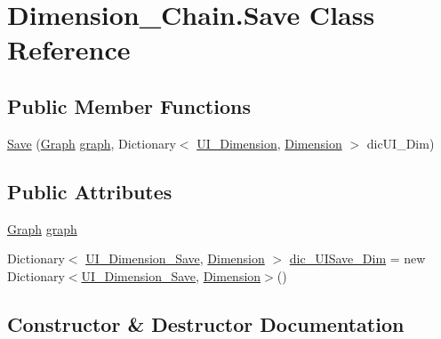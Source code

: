 \hypertarget{class_dimension___chain_1_1_save}{}\section{Dimension\+\_\+\+Chain.\+Save Class Reference}
\label{class_dimension___chain_1_1_save}
\subsection*{Public Member Functions}
\begin{DoxyCompactItemize}
\item 
\mbox{\hyperlink{class_dimension___chain_1_1_save_a609755b7e3eb7769c2679869f93cf8eb}{Save}} (\mbox{\hyperlink{class_dimension___chain_1_1_graph}{Graph}} \mbox{\hyperlink{class_dimension___chain_1_1_save_ae83ba48253eae3156de679a361ac853a}{graph}}, Dictionary$<$ \mbox{\hyperlink{class_dimension___chain_1_1_u_i___dimension}{U\+I\+\_\+\+Dimension}}, \mbox{\hyperlink{class_dimension___chain_1_1_dimension}{Dimension}} $>$ dic\+U\+I\+\_\+\+Dim)
\end{DoxyCompactItemize}
\subsection*{Public Attributes}
\begin{DoxyCompactItemize}
\item 
\mbox{\hyperlink{class_dimension___chain_1_1_graph}{Graph}} \mbox{\hyperlink{class_dimension___chain_1_1_save_ae83ba48253eae3156de679a361ac853a}{graph}}
\item 
Dictionary$<$ \mbox{\hyperlink{class_dimension___chain_1_1_u_i___dimension___save}{U\+I\+\_\+\+Dimension\+\_\+\+Save}}, \mbox{\hyperlink{class_dimension___chain_1_1_dimension}{Dimension}} $>$ \mbox{\hyperlink{class_dimension___chain_1_1_save_a89f0c6170a8dc6940853086f8d84ab5f}{dic\+\_\+\+U\+I\+Save\+\_\+\+Dim}} = new Dictionary$<$\mbox{\hyperlink{class_dimension___chain_1_1_u_i___dimension___save}{U\+I\+\_\+\+Dimension\+\_\+\+Save}}, \mbox{\hyperlink{class_dimension___chain_1_1_dimension}{Dimension}}$>$()
\end{DoxyCompactItemize}


\subsection{Constructor \& Destructor Documentation}
\mbox{\label{class_dimension___chain_1_1_save_a609755b7e3eb7769c2679869f93cf8eb}} 
